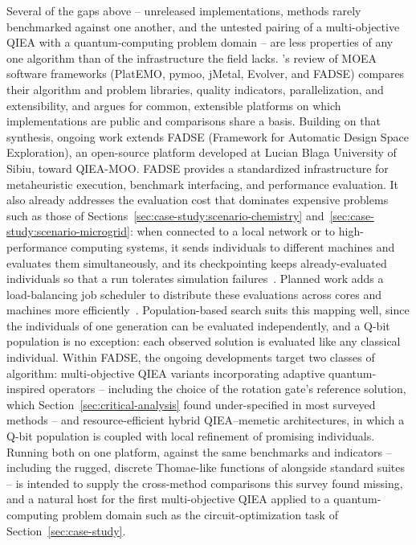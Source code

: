 Several of the gaps above -- unreleased implementations, methods rarely
benchmarked against one another, and the untested pairing of a
multi-objective QIEA with a quantum-computing problem domain -- are
less properties of any one algorithm than of the infrastructure the
field lacks. \citet{patrausanu2024frameworks}'s review of MOEA
software frameworks (PlatEMO, pymoo, jMetal, Evolver, and FADSE)
compares their algorithm and problem libraries, quality indicators,
parallelization, and extensibility, and argues for common, extensible
platforms on which implementations are public and comparisons share a
basis. Building on that synthesis, ongoing work extends FADSE
(Framework for Automatic Design Space Exploration), an open-source
platform developed at Lucian Blaga University of Sibiu, toward
QIEA-MOO. FADSE provides a standardized infrastructure for
metaheuristic execution, benchmark interfacing, and performance
evaluation. It also already addresses the evaluation cost that
dominates expensive problems such as those of
Sections~\ref{sec:case-study:scenario-chemistry}
and~\ref{sec:case-study:scenario-microgrid}: when connected to a local
network or to high-performance computing systems, it sends individuals
to different machines and evaluates them simultaneously, and its
checkpointing keeps already-evaluated individuals so that a run
tolerates simulation failures~\citep{patrausanu2024frameworks}. Planned
work adds a load-balancing job scheduler to distribute these
evaluations across cores and machines more
efficiently~\citep{patrausanu2024frameworks}. Population-based search
suits this mapping well, since the individuals of one generation can be
evaluated independently, and a Q-bit population is no exception: each
observed solution is evaluated like any classical individual. Within
FADSE, the ongoing developments target two classes of
algorithm: multi-objective QIEA variants incorporating adaptive
quantum-inspired operators -- including the choice of the rotation
gate's reference solution, which Section~\ref{sec:critical-analysis}
found under-specified in most surveyed methods -- and resource-efficient hybrid QIEA--memetic
architectures, in which a Q-bit population is coupled with local
refinement of promising individuals. Running both on one platform,
against the same benchmarks and indicators -- including the rugged,
discrete Thomae-like functions of \citet{patrausanu2026thomae} alongside
standard suites -- is intended to supply the cross-method comparisons
this survey found missing, and a natural host for the first
multi-objective QIEA applied to a quantum-computing problem domain
such as the circuit-optimization task of
Section~\ref{sec:case-study}.
